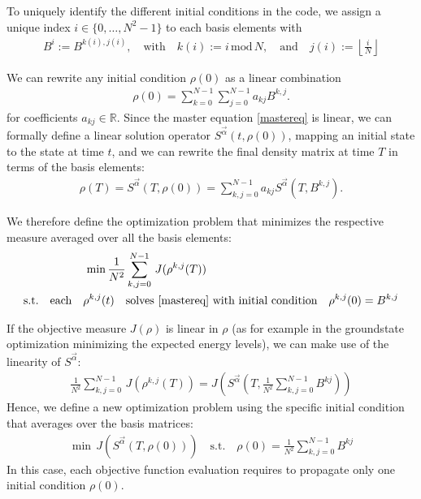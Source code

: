 \documentclass[letterpaper]{article}
\newcommand{\R}{\mathds{R}}
\begin{document}
To uniquely identify the different initial conditions in the code, we assign a
unique index $i \in \{0,\dots, N^2-1\}$ to each basis elements with 
\begin{align*}
  B^i := B^{k(i), j(i)}, \quad \text{with} \quad k(i) := i \,\mbox{mod}\, N,
  \quad \text{and} \quad j(i) := \left\lfloor \frac{i}{N} \right\rfloor
\end{align*}

We can rewrite any initial condition $\rho(0)$ as a linear combination 
\begin{align}
  \rho(0) = \sum_{k=0}^{N-1} \sum_{j=0}^{N-1} a_{kj} B^{k, j}.
\end{align}
for coefficients $a_{kj} \in \R$.
Since the master equation \eqref{mastereq} is linear, we can formally define a
linear solution operator $S^{\vec{\alpha}}(t,\rho(0))$, mapping an initial state
to the state at time $t$, and we can rewrite the final density matrix at time
$T$ in terms of the basis elements:
\begin{align}
  \rho(T) = S^{\vec{\alpha}}(T,\rho(0)) = \sum_{k,j=0}^{N-1} a_{kj}
  S^{\vec{\alpha}}(T,B^{k, j}).
\end{align}

We therefore define the optimization problem that minimizes the respective
measure averaged over all the basis elements:
\begin{align}\label{optimproblem_basis}
  \min \frac{1}{N^2} & \sum_{k,j=0}^{N-1} \, J(\rho^{k,j}(T))  \\
  \text{s.t.} \quad  \text{each} \quad \rho^{k,j}(t) \quad & \text{solves
  \eqref{mastereq} with initial condition} \quad \rho^{k,j}(0) = B^{k,j}
\end{align}

If the objective measure $J(\rho)$ is linear in $\rho$ (as for example in the
groundstate optimization minimizing the expected energy levels), we can make use
of the linearity of $S^{\vec{\alpha}}$:
\begin{align}
   \frac{1}{N^2}  \sum_{k,j=0}^{N-1} \, J\left(\rho^{k,j}(T)\right) =
   J\left(S^{\vec{\alpha}}\left(T,\frac{1}{N^2}  \sum_{k,j=0}^{N-1}
   B^{kj}\right)\right)
\end{align}
Hence, we define a new optimization problem using the specific initial condition
that averages over the basis matrices:
\begin{align}
  \min \, J(S^{\vec{\alpha}}(T,\rho(0))) \quad \text{s.t.} \quad \rho(0) =
  \frac{1}{N^2}  \sum_{k,j=0}^{N-1} B^{kj}
\end{align}
In this case, each objective function evaluation requires to propagate only one
initial condition $\rho(0)$. 
\end{document}
